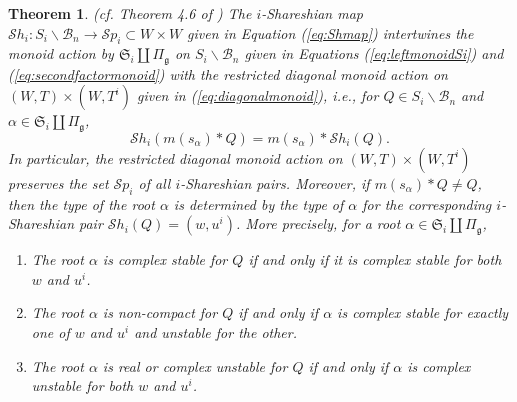 \documentclass[12pt]{amsart}
\numberwithin{equation}{section}
\newtheorem{thm}{Theorem}[section]
\theoremstyle{remark}
\theoremstyle{definition}
\newcommand{\fg}{\mbox{${\mathfrak g}$}}
\newcommand{\B}{\mathcal{B}}
\newcommand{\Sh}{\mathcal{S}h}
\newcommand{\Sp}{\mathcal{S}p}
\begin{document}
\begin{thm}\label{thm:intertwine}(cf. Theorem 4.6 of \cite{Shpairs})
The $i$-Shareshian map $\Sh_{i}: S_{i}\backslash\B_{n} \to \Sp_{i}\subset W\times W$ given in Equation (\ref{eq:Shmap})
intertwines the monoid action by $\mathfrak{S}_i\coprod \Pi_{\fg}$ on $S_{i}\backslash\B_{n}$ given in Equations (\ref{eq:leftmonoidSi}) and (\ref{eq:secondfactormonoid}) with the restricted diagonal monoid action on $(W,T)\times (W,T^{i})$ given in (\ref{eq:diagonalmonoid}), i.e., for $Q\in S_{i}\backslash\B_{n}$ and $\alpha\in\mathfrak{S}_i\coprod \Pi_{\fg}$,
 \begin{equation}\label{eq:Shinter}
 \Sh_{i}(m(s_{\alpha})*Q)=m(s_{\alpha})*\Sh_{i}(Q).  
 \end{equation}
In particular, the restricted diagonal monoid action on $(W,T)\times (W, T^{i})$ preserves the set $\Sp_{i}$ of all $i$-Shareshian pairs.  
Moreover, if $m(s_{\alpha})*Q\neq Q$, then the type of the root $\alpha$ is determined by the type of $\alpha$ for the corresponding $i$-Shareshian pair $\Sh_{i}(Q)=(w,u^{i})$.  More precisely, for a root $\alpha\in\mathfrak{S}_i\coprod \Pi_{\fg}$, 
\begin{enumerate}
\item The root $\alpha$ is complex stable for $Q$ if and only if it is complex stable for both $w$ and $u^{i}$.%
\item The root $\alpha$ is non-compact for $Q$ if and only if $\alpha$ is complex stable for exactly one of $w$ and $u^{i}$ and unstable for the other. %
\item The root $\alpha$ is real or complex unstable for $Q$ if and only if $\alpha$ is complex unstable for both $w$ and $u^{i}$.
\end{enumerate}
\end{thm}
\end{document}
